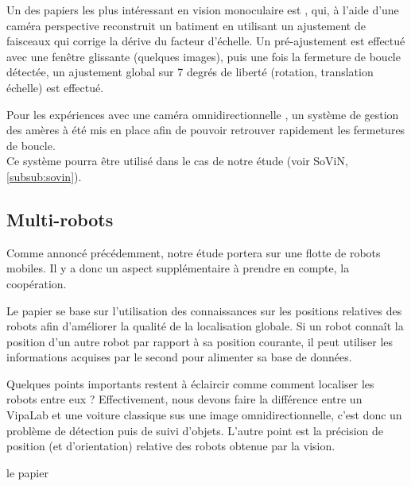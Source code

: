 Un des papiers les plus intéressant en vision monoculaire est \cite{Strasdat10}, qui, à l'aide d'une caméra perspective reconstruit un batiment en utilisant un ajustement de faisceaux qui corrige la dérive du facteur d'échelle.
Un pré-ajustement est effectué avec une fenêtre glissante (quelques images), puis une fois la fermeture de boucle détectée, un ajustement global sur 7 degrés de liberté (rotation, translation échelle) est effectué. 


Pour les expériences avec une caméra omnidirectionnelle \cite{Korrapati11}, un système de gestion des amères à été mis en place afin de pouvoir retrouver rapidement les fermetures de boucle.\\
Ce système pourra être utilisé dans le cas de notre étude (voir SoViN, \ref{subsub:sovin}).



\subsection{Multi-robots}

Comme annoncé précédemment, notre étude portera sur une flotte de robots mobiles.
Il y a donc un aspect supplémentaire à prendre en compte, la coopération.

Le papier \cite{Hukui10} se base sur l'utilisation des connaissances sur les positions relatives des robots afin d'améliorer la qualité de la localisation globale.
Si un robot connaît la position d'un autre robot par rapport à sa position courante, il peut utiliser les informations acquises par le second pour alimenter sa base de données.

Quelques points importants restent à éclaircir comme comment localiser les robots entre eux ?
Effectivement, nous devons faire la différence entre un VipaLab et une voiture classique sus une image omnidirectionnelle, c'est donc un problème de détection puis de suivi d'objets.
L'autre point est la précision de position (et d'orientation) relative des robots obtenue par la vision.



 le papier \cite{Howard06}


